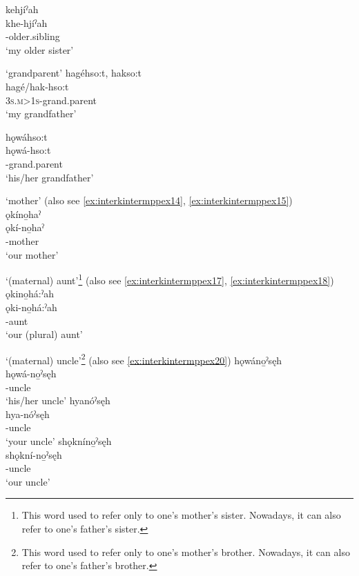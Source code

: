 \ex kehjíˀah\\
\gll khe-hjíˀah\\
 -older.sibling\\
\glt `my older sister'
\z
\z


\ea\label{ex:interkintermppex10}  ‘grandparent’
\ea hagéhso:t, hakso:t\\
\gll hagé/hak-hso:t \\
 \textsc{3s.m>1s}-grand.parent\\
\glt `my grandfather'

\ex hǫwáhso:t\\
\gll hǫwá-hso:t\\
 -grand.parent\\
\glt `his/her grandfather'
\z
\z

\ea\label{ex:interkintermppex13}  ‘mother’ (also see \ref{ex:interkintermppex14}, \ref{ex:interkintermppex15})\\
ǫkíno̱haˀ\\
\gll ǫkí-no̱haˀ\\
 -mother\\
\glt `our mother'
\z

\newpage
\ea\label{ex:interkintermppex16}  ‘(maternal) aunt’\footnote{This word used to refer only to one’s mother’s sister. Nowadays, it can also refer to one’s father’s sister.} (also see \ref{ex:interkintermppex17}, \ref{ex:interkintermppex18})\\
ǫkino̱há:ˀah\\
\gll ǫki-no̱há:ˀah\\
 -aunt\\
\glt `our (plural) aunt'
\z


\ea\label{ex:interkintermppex19}  ‘(maternal) uncle’\footnote{This word used to refer only to one’s mother’s brother. Nowadays, it can also refer to one’s father’s brother.} (also see \ref{ex:interkintermppex20})
\ea hǫwáno̱ˀsęh\\
\gll hǫwá-no̱ˀsęh\\
 -uncle\\
\glt `his/her uncle'
\ex hyanóˀsęh\\
\gll hya-nóˀsęh\\
 -uncle\\
\glt `your uncle'
\ex shǫkníno̱ˀsęh\\
\gll shǫkní-no̱ˀsęh\\
 -uncle\\
\glt `our uncle'
\z
\z

